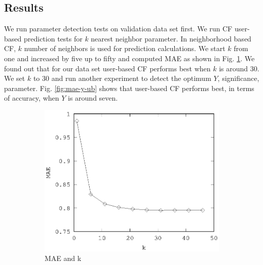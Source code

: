\documentclass[conference]{IEEEtran}
\begin{document}
\subsection{Results}

We run parameter detection tests on validation data set first. We run CF user-based prediction tests for $k$ nearest neighbor parameter. In neighborhood based CF, $k$ number of neighbors is used for prediction calculations. We start $k$ from one and increased by five up to fifty and computed MAE as shown in Fig. \ref{fig:mae-k-ub}. We found out that for our data set user-based CF performs best when $k$ is around 30. We set $k$ to 30 and run another experiment to detect the optimum $Y$, significance, parameter. Fig. \ref{fig:mae-y-ub} shows that user-based CF performs best, in terms of accuracy, when $Y$ is around seven.
\begin{figure}
        \begin{subfigure}[b]{0.225\textwidth}
                \includegraphics[width=\textwidth]{charts/ub-mae-k.eps}
                \caption{MAE and k}
                \label{fig:mae-k-ub}
        \end{subfigure}
        \quad
        \begin{subfigure}[b]{0.225\textwidth}

\end{subfigure}
\end{figure}
\end{document}
